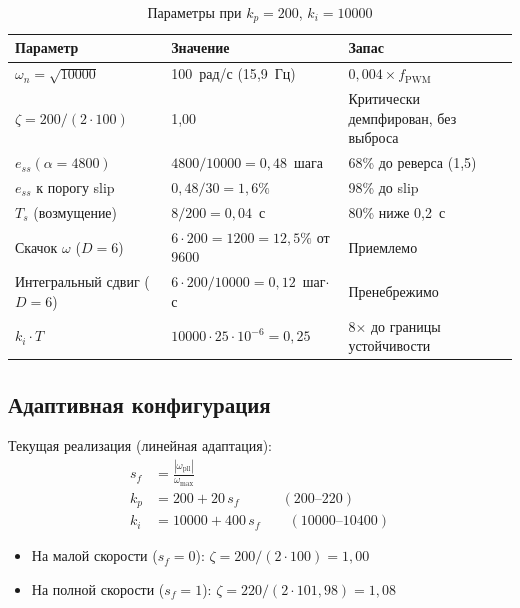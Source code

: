 \documentclass[12pt,a4paper]{article}
\begin{document}
\begin{table}[H]
\centering
\caption{Параметры при $k_p = 200$, $k_i = 10000$}
\begin{tabular}{lll}
\toprule
Параметр & Значение & Запас \\
\midrule
$\omega_n = \sqrt{10000}$ & 100~рад/с (15{,}9~Гц) & $0{,}004 \times f_\text{PWM}$ \\
$\zeta = 200/(2\cdot100)$ & 1{,}00 & Критически демпфирован, без выброса \\
$e_{ss}(\alpha=4800)$ & $4800/10000 = 0{,}48$~шага & 68\% до реверса (1{,}5) \\
$e_{ss}$ к порогу slip & $0{,}48/30 = 1{,}6\%$ & 98\% до slip \\
$T_s$ (возмущение) & $8/200 = 0{,}04$~с & 80\% ниже 0{,}2~с \\
Скачок $\omega$ ($D=6$) & $6\cdot200 = 1200 = 12{,}5\%$ от 9600 & Приемлемо \\
Интегральный сдвиг ($D=6$) & $6\cdot200/10000 = 0{,}12$~шаг$\cdot$с & Пренебрежимо \\
$k_i \cdot T$ & $10000 \cdot 25\cdot10^{-6} = 0{,}25$ & 8$\times$ до границы устойчивости \\
\bottomrule
\end{tabular}
\end{table}

\subsection{Адаптивная конфигурация}
\label{sec:adaptive}

Текущая реализация (линейная адаптация):
\begin{equation}
  \boxed{
  \begin{aligned}
    s_f &= \frac{|\omega_\text{pll}|}{\omega_\text{max}} \\
    k_p &= 200 + 20\,s_f \qquad\quad (200\text{--}220) \\
    k_i &= 10000 + 400\,s_f \qquad (10000\text{--}10400)
  \end{aligned}
  }
  \label{eq:adaptive}
\end{equation}

\begin{itemize}
  \item На малой скорости ($s_f=0$): $\zeta = 200/(2\cdot100) = 1{,}00$
  \item На полной скорости ($s_f=1$): $\zeta = 220/(2\cdot101{,}98) = 1{,}08$
\end{itemize}
\end{document}
